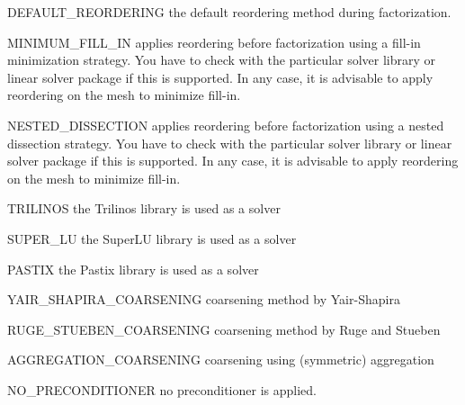 \begin{memberdesc}[SolverOptions]{DEFAULT_REORDERING}
the default reordering method during factorization.
\end{memberdesc}

\begin{memberdesc}[SolverOptions]{MINIMUM_FILL_IN}
applies reordering before factorization using a fill-in minimization strategy. You have to check with the particular solver library or
linear solver package if this is supported. In any case, it is advisable to apply reordering on the mesh to minimize fill-in.
\end{memberdesc}

\begin{memberdesc}[SolverOptions]{NESTED_DISSECTION}
applies reordering before factorization using a nested dissection strategy. You have to check with the particular solver library or
linear solver package if this is supported. In any case, it is advisable to apply reordering on the mesh to minimize fill-in.
\end{memberdesc}

\begin{memberdesc}[SolverOptions]{TRILINOS}
the Trilinos library is used as a solver~
\end{memberdesc}

\begin{memberdesc}[SolverOptions]{SUPER_LU}
the SuperLU library is used as a solver~
\end{memberdesc}

\begin{memberdesc}[SolverOptions]{PASTIX}
the Pastix library is used as a solver~
\end{memberdesc}


\begin{memberdesc}[SolverOptions]{YAIR_SHAPIRA_COARSENING}
\AMG coarsening method by Yair-Shapira
\end{memberdesc}

\begin{memberdesc}[SolverOptions]{RUGE_STUEBEN_COARSENING} \AMG coarsening method by Ruge and Stueben
\end{memberdesc}

\begin{memberdesc}[SolverOptions]{AGGREGATION_COARSENING} \AMG coarsening using (symmetric) aggregation 
\end{memberdesc}

\begin{memberdesc}[SolverOptions]{NO_PRECONDITIONER}
no preconditioner is applied.
\end{memberdesc}

